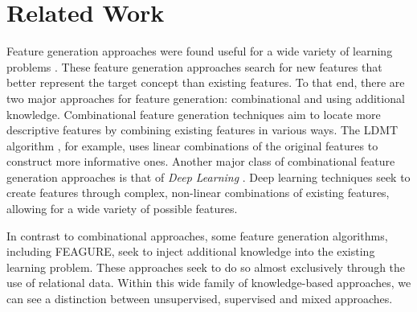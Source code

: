 \documentclass[twoside,11pt]{article}
\theoremstyle{definition}
\begin{document}





\section{Related Work}

Feature generation approaches were found useful for a wide variety of learning problems \cite{markovitch2002feature,ragavan1993complex,utgo1991linear}.
These feature generation approaches search for new features that better represent the target concept than existing features. To that end, there are two major approaches for feature generation: combinational and using additional knowledge.
Combinational feature generation techniques aim to locate more descriptive features by combining existing features in various ways. The LDMT algorithm \cite{utgo1991linear}, for example, uses linear combinations of the original features to construct more informative ones. Another major class of combinational feature generation approaches is that of \emph{Deep Learning} \cite{lecun1998gradient,bengio2009learning,plotz2011featurefull,kim2013deepfull}. Deep learning techniques seek to create features through complex, non-linear combinations of existing features, allowing for a wide variety of possible features.

In contrast to combinational approaches, some feature generation algorithms, including FEAGURE, seek to inject additional knowledge into the existing learning problem. These approaches seek to do so almost exclusively through the use of relational data. 
Within this wide family of knowledge-based approaches, we can see a distinction between unsupervised, supervised and mixed approaches.
\end{document}
